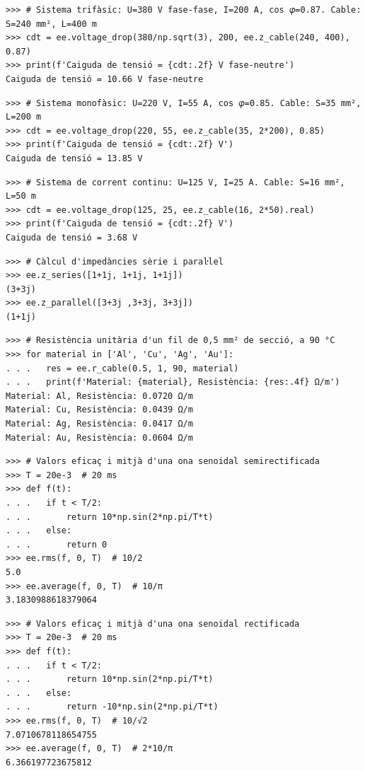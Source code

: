 \begin{lstlisting}
>>> # Sistema trifàsic: U=380 V fase-fase, I=200 A, cos 𝜑=0.87. Cable: S=240 mm², L=400 m
>>> cdt = ee.voltage_drop(380/np.sqrt(3), 200, ee.z_cable(240, 400), 0.87)
>>> print(f'Caiguda de tensió = {cdt:.2f} V fase-neutre')
Caiguda de tensió = 10.66 V fase-neutre
\end{lstlisting}

\begin{lstlisting}
>>> # Sistema monofàsic: U=220 V, I=55 A, cos 𝜑=0.85. Cable: S=35 mm², L=200 m
>>> cdt = ee.voltage_drop(220, 55, ee.z_cable(35, 2*200), 0.85)
>>> print(f'Caiguda de tensió = {cdt:.2f} V')
Caiguda de tensió = 13.85 V
\end{lstlisting}

\begin{lstlisting}
>>> # Sistema de corrent continu: U=125 V, I=25 A. Cable: S=16 mm², L=50 m
>>> cdt = ee.voltage_drop(125, 25, ee.z_cable(16, 2*50).real)
>>> print(f'Caiguda de tensió = {cdt:.2f} V')
Caiguda de tensió = 3.68 V
\end{lstlisting}

\begin{lstlisting}
>>> # Càlcul d'impedàncies sèrie i paraŀlel
>>> ee.z_series([1+1j, 1+1j, 1+1j])
(3+3j)
>>> ee.z_parallel([3+3j ,3+3j, 3+3j])
(1+1j)
\end{lstlisting}

\begin{lstlisting}
>>> # Resistència unitària d'un fil de 0,5 mm² de secció, a 90 °C 
>>> for material in ['Al', 'Cu', 'Ag', 'Au']:
. . .   res = ee.r_cable(0.5, 1, 90, material)
. . .   print(f'Material: {material}, Resistència: {res:.4f} Ω/m')
Material: Al, Resistència: 0.0720 Ω/m
Material: Cu, Resistència: 0.0439 Ω/m
Material: Ag, Resistència: 0.0417 Ω/m
Material: Au, Resistència: 0.0604 Ω/m        
\end{lstlisting}

\begin{lstlisting}
>>> # Valors eficaç i mitjà d'una ona senoidal semirectificada
>>> T = 20e-3  # 20 ms
>>> def f(t):
. . .   if t < T/2:
. . .       return 10*np.sin(2*np.pi/T*t)
. . .   else:
. . .       return 0
>>> ee.rms(f, 0, T)  # 10/2
5.0
>>> ee.average(f, 0, T)  # 10/π
3.1830988618379064
\end{lstlisting}

\begin{lstlisting}
>>> # Valors eficaç i mitjà d'una ona senoidal rectificada
>>> T = 20e-3  # 20 ms
>>> def f(t):
. . .   if t < T/2:
. . .       return 10*np.sin(2*np.pi/T*t)
. . .   else:
. . .       return -10*np.sin(2*np.pi/T*t)
>>> ee.rms(f, 0, T)  # 10/√2
7.0710678118654755
>>> ee.average(f, 0, T)  # 2*10/π
6.366197723675812
\end{lstlisting}

